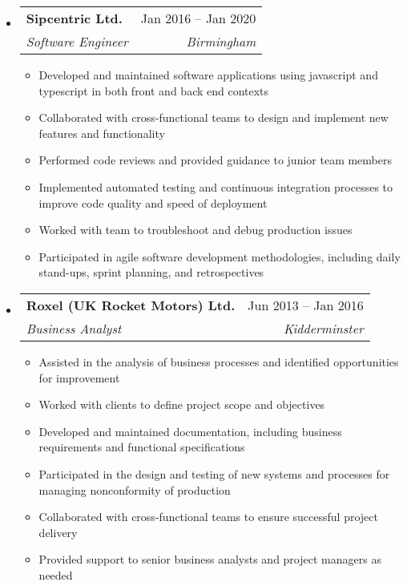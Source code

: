 \documentclass[a4paper,12pt]{article}[leftmargin=*]
\makeatletter
\def \entryspacing {-0pt}
\renewcommand{\section}[2]{\vspace{5pt}
  \colorbox{secondary}{\color{white}\raggedbottom\normalsize\textbf{{#1}{\hspace{7pt}#2}}}
}
\newcommand{\resumeEntryStart}{\begin{itemize}[leftmargin=2.5mm]}
\newcommand{\resumeEntryEnd}{\end{itemize}\vspace{\entryspacing}}
\newcommand{\resumeItemListStart}{\begin{itemize}[leftmargin=4.5mm]}
\newcommand{\resumeItemListEnd}{\end{itemize}}
\newcommand{\resumeItem}[1]{
  \item\small{
    {#1 \vspace{-2pt}}
  }
}
\newcommand{\resumeEntryTSDL}[4]{
  \vspace{-1pt}\item[]
    \begin{tabularx}{0.97\textwidth}{X@{\hspace{60pt}}r}
      \textbf{\color{primary}#1} & {\firabook\color{accent}\small#2} \\
      \textit{\color{accent}\small#3} & \textit{\color{accent}\small#4} \\
    \end{tabularx}\vspace{-6pt}
}
\newcommand{\resumeEntryS}[2]{
  \item[]\small{
    \textbf{\color{primary}#1 }{ #2 \vspace{-6pt}}
  }
}
\makeatother
\begin{document}
  \resumeEntryStart
    \resumeEntryTSDL
      {Sipcentric Ltd.}{Jan 2016 -- Jan 2020}
      {Software Engineer}{Birmingham}
    \resumeItemListStart
      \resumeItem {Developed and maintained software applications using javascript and typescript in both front and back end contexts}
      \resumeItem {Collaborated with cross-functional teams to design and implement new features and functionality}
      \resumeItem {Performed code reviews and provided guidance to junior team members}
      \resumeItem {Implemented automated testing and continuous integration processes to improve code quality and speed of deployment}
      \resumeItem {Worked with team to troubleshoot and debug production issues}
      \resumeItem {Participated in agile software development methodologies, including daily stand-ups, sprint planning, and retrospectives}
    \resumeItemListEnd
  \resumeEntryEnd

  \resumeEntryStart
    \resumeEntryTSDL
      {Roxel (UK Rocket Motors) Ltd.}{Jun 2013 -- Jan 2016}
      {Business Analyst}{Kidderminster}
    \resumeItemListStart
        \resumeItem {Assisted in the analysis of business processes and identified opportunities for improvement}
        \resumeItem {Worked with clients to define project scope and objectives}
        \resumeItem {Developed and maintained documentation, including business requirements and functional specifications}
        \resumeItem {Participated in the design and testing of new systems and processes for managing nonconformity of production}
        \resumeItem {Collaborated with cross-functional teams to ensure successful project delivery}
        \resumeItem {Provided support to senior business analysts and project managers as needed}
    \resumeItemListEnd
  \resumeEntryEnd

\end{document}
